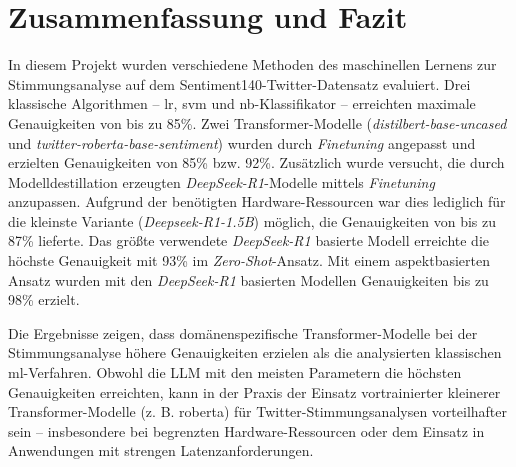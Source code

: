 \section{Zusammenfassung und Fazit}\label{sec:zusammenfassung-und-fazit}

In diesem Projekt wurden verschiedene Methoden des maschinellen Lernens zur Stimmungsanalyse auf dem Sentiment140-Twitter-Datensatz evaluiert.
Drei klassische Algorithmen – \gls{lr}, \gls{svm} und \gls{nb}-Klassifikator – erreichten maximale Genauigkeiten von bis zu 85\%.
Zwei Transformer-Modelle (\emph{distilbert-base-uncased} und \emph{twitter-roberta-base-sentiment}) wurden durch \textit{Finetuning} angepasst und erzielten Genauigkeiten von 85\% bzw. 92\%.
Zusätzlich wurde versucht, die durch Modelldestillation erzeugten \emph{DeepSeek-R1}-Modelle mittels \textit{Finetuning} anzupassen.
Aufgrund der benötigten Hardware-Res\-sour\-cen war dies lediglich für die kleinste Variante (\emph{Deepseek-R1-1.5B}) möglich, die Genauigkeiten von bis zu 87\% lieferte.
Das größte verwendete \emph{DeepSeek-R1} basierte Modell erreichte die höchste Genauigkeit mit 93\% im \textit{Zero-Shot}-Ansatz.
Mit einem aspektbasierten Ansatz wurden mit den \emph{DeepSeek-R1} basierten Modellen Genauigkeiten bis zu 98\% erzielt.

Die Ergebnisse zeigen, dass domänenspezifische Transformer-Modelle bei der Stimmungsanalyse höhere Genauigkeiten erzielen als die analysierten klassischen \gls{ml}-Verfahren.
Obwohl die LLM mit den meisten Parametern die höchsten Genauigkeiten erreichten, kann in der Praxis der Einsatz vortrainierter kleinerer Transformer-Modelle (z. B. \gls{roberta}) für Twitter-Stimmungsanalysen vorteilhafter sein – insbesondere bei begrenzten Hardware-Ressourcen oder dem Einsatz in Anwendungen mit strengen Latenzanforderungen.
